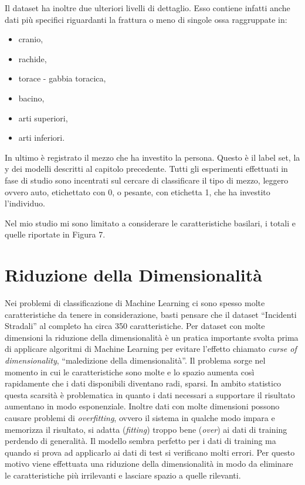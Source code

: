 \documentclass[12pt,italian]{report}
\begin{document}
Il dataset ha inoltre due ulteriori livelli di dettaglio. Esso contiene infatti anche dati più specifici riguardanti la frattura o meno di singole ossa raggruppate in:
\begin{itemize}
	\item cranio,
	\item rachide,
	\item torace - gabbia toracica,
	\item bacino,
	\item arti superiori,
	\item arti inferiori.
\end{itemize}
In ultimo è registrato il mezzo che ha investito la persona. Questo è il label set, la y dei modelli descritti al capitolo precedente. Tutti gli esperimenti effettuati in fase di studio sono incentrati sul cercare di classificare il tipo di mezzo, leggero ovvero auto, etichettato con 0, o pesante, con etichetta 1, che ha investito l'individuo.

Nel mio studio mi sono limitato a considerare le caratteristiche basilari, i totali e quelle riportate in Figura 7.
\section{Riduzione della Dimensionalità}
\label{sec:riduzione}
Nei problemi di classificazione di Machine Learning ci sono spesso molte caratteristiche da tenere in considerazione, basti pensare che il dataset ``Incidenti Stradali'' al completo ha circa 350 caratteristiche. Per dataset con molte dimensioni la riduzione della dimensionalità è un pratica importante svolta prima di applicare algoritmi di Machine Learning per evitare l'effetto chiamato \textit{curse of dimensionality}, ``maledizione della dimensionalità''\cite{shalevshwartz2014understanding}. Il problema sorge nel momento in cui le caratteristiche sono molte e lo spazio aumenta così rapidamente che i dati disponibili diventano radi, sparsi. In ambito statistico questa scarsità è problematica in quanto i dati necessari a supportare il risultato aumentano in modo esponenziale.
Inoltre dati con molte dimensioni possono causare problemi di \textit{overfitting}, ovvero il sistema in qualche modo impara e memorizza il risultato, si adatta (\textit{fitting}) troppo bene (\textit{over}) ai dati di training perdendo di generalità. Il modello sembra perfetto per i dati di training ma quando si prova ad applicarlo ai dati di test si verificano molti errori.
Per questo motivo viene effettuata una riduzione della dimensionalità in modo da eliminare le caratteristiche più irrilevanti e lasciare spazio a quelle rilevanti. 
\end{document}
